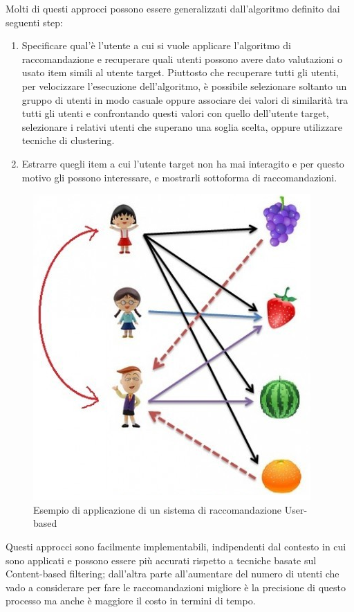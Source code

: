 Molti di questi approcci possono essere generalizzati dall'algoritmo definito dai seguenti step:
\begin{enumerate}
	\item Specificare qual'è l'utente a cui si vuole applicare l'algoritmo di raccomandazione e recuperare quali utenti possono 
	avere dato valutazioni o usato item simili al utente target. Piuttosto che recuperare tutti gli utenti, per velocizzare l'esecuzione
	dell'algoritmo, è possibile selezionare soltanto un gruppo di utenti in modo casuale oppure associare dei valori di similarità tra 
	tutti gli utenti e confrontando questi valori con quello dell'utente target, selezionare i relativi utenti che superano una soglia
	scelta, oppure utilizzare tecniche di clustering.
	\item Estrarre quegli item a cui l'utente target non ha mai interagito e per questo motivo gli possono interessare, e mostrarli 
	sottoforma di raccomandazioni.
\end{enumerate}

\begin{figure}[ht!]
	\centering
	\includegraphics[scale=0.5]{images/UB_CF_ex.png}
	\caption{Esempio di applicazione di un sistema di raccomandazione User-based}
	\label{fig:UB_CF}
\end{figure}

Questi approcci sono facilmente implementabili, indipendenti dal contesto in cui sono applicati e possono essere più accurati rispetto
a tecniche basate sul Content-based filtering; dall'altra parte all'aumentare del numero di utenti che vado a considerare per fare le 
raccomandazioni migliore è la precisione di questo processo ma anche è maggiore il costo in termini di tempo.  

